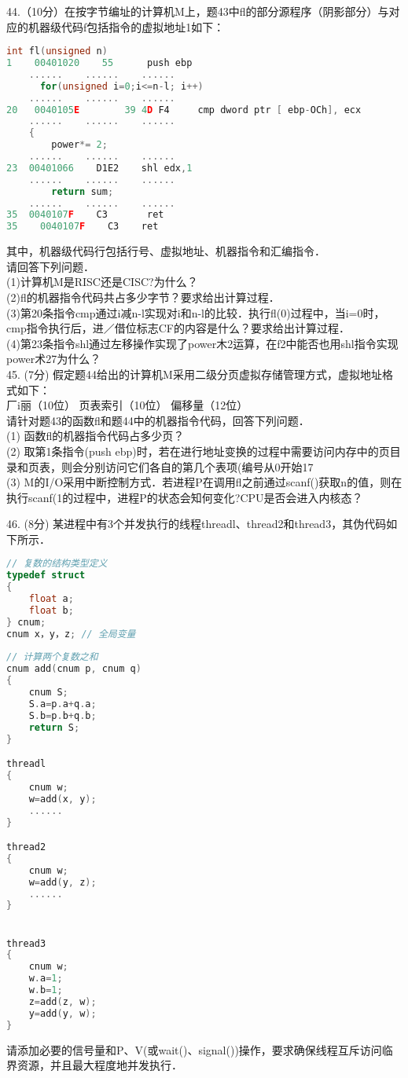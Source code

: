 44.（10分）在按字节编址的计算机M上，题43中fl的部分源程序（阴影部分）与对应的机器级代码f包括指令的虚拟地址1如下：
\begin{lstlisting}[language=cpp]
      int fl(unsigned n)
1    00401020    55      push ebp
    ......    ......    ......
      for(unsigned i=0;i<=n-l; i++)
    ......    ......    ......
20   0040105E        39 4D F4     cmp dword ptr [ ebp-OCh], ecx
    ......    ......    ......
    {
        power*= 2;
    ......    ......    ......
23  00401066    D1E2    shl edx,1
    ......    ......    ......
        return sum;
    ......    ......    ......
35  0040107F    C3       ret
35    0040107F    C3    ret
\end{lstlisting}
其中，机器级代码行包括行号、虚拟地址、机器指令和汇编指令． \\
请回答下列问题． \\
(1)计算机M是RISC还是CISC?为什么？ \\
(2)fl的机器指令代码共占多少字节？要求给出计算过程． \\
(3)第20条指令cmp通过i减n-l实现对i和n-l的比较．执行fl(0)过程中，当i=0时，cmp指令执行后，进／借位标志CF的内容是什么？要求给出计算过程． \\
(4)第23条指令shl通过左移操作实现了power木2运算，在f2中能否也用shl指令实现power术27为什么？ \\

45. (7分) 假定题44给出的计算机M采用二级分页虚拟存储管理方式，虚拟地址格式如下： \\
厂i丽（10位）    页表索引（10位）    偏移量（12位） \\
请针对题43的函数fl和题44中的机器指令代码，回答下列问题． \\
(1) 函数fl的机器指令代码占多少页？ \\
(2) 取第1条指令(push ebp)时，若在进行地址变换的过程中需要访问内存中的页目录和页表，则会分别访问它们各自的第几个表项(编号从0开始17 \\
(3) M的I/O采用中断控制方式．若进程P在调用fl之前通过scanf()获取n的值，则在执行scanf(1的过程中，进程P的状态会知何变化?CPU是否会进入内核态？

46. (8分) 某进程中有3个并发执行的线程threadl、thread2和thread3，其伪代码如下所示． \\
\begin{lstlisting}[language=cpp]
// 复数的结构类型定义
typedef struct       
{
    float a;
    float b;
} cnum;         
cnum x，y，z; // 全局变量
                          
// 计算两个复数之和     
cnum add(cnum p, cnum q)
{                         
    cnum S;  
    S.a=p.a+q.a;
    S.b=p.b+q.b;      
    return S;
}

threadl
{             
    cnum w;
    w=add(x, y);
    ......
}

thread2
{
    cnum w;
    w=add(y, z);
    ......
}


thread3
{
    cnum w;
    w.a=1;
    w.b=1;
    z=add(z, w);
    y=add(y, w);
}
\end{lstlisting}
请添加必要的信号量和P、V(或wait()、signal())操作，要求确保线程互斥访问临界资源，并且最大程度地并发执行．

